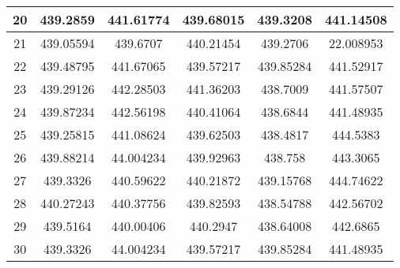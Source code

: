 \begin{table}
\begin{center}
\begin{tabular}{|c|c|c|c|c|c|}
20 & 439.2859  & 441.61774 & 439.68015 & 439.3208  & 441.14508 \\ \hline
21 & 439.05594 & 439.6707  & 440.21454 & 439.2706  & 22.008953 \\ \hline
22 & 439.48795 & 441.67065 & 439.57217 & 439.85284 & 441.52917 \\ \hline
23 & 439.29126 & 442.28503 & 441.36203 & 438.7009  & 441.57507 \\ \hline
24 & 439.87234 & 442.56198 & 440.41064 & 438.6844  & 441.48935 \\ \hline
25 & 439.25815 & 441.08624 & 439.62503 & 438.4817  & 444.5383  \\ \hline
26 & 439.88214 & 44.004234 & 439.92963 & 438.758   & 443.3065  \\ \hline
27 & 439.3326  & 440.59622 & 440.21872 & 439.15768 & 444.74622 \\ \hline
28 & 440.27243 & 440.37756 & 439.82593 & 438.54788 & 442.56702 \\ \hline
29 & 439.5164  & 440.00406 & 440.2947  & 438.64008 & 442.6865  \\ \hline
30 & 439.3326  & 44.004234 & 439.57217 & 439.85284 & 441.48935 \\ \hline
\hline
\end{tabular}
\label{table:przyklad}
\end{center}
\end{table}



